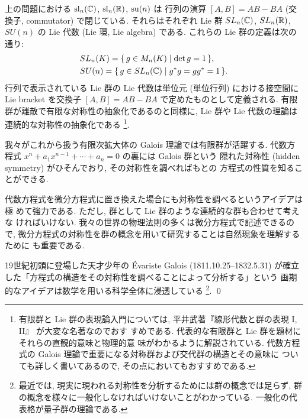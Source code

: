 \documentclass[12pt,twoside]{jarticle}
\begin{document}
\begin{guide}
  上の問題における $\mathrm{sl}_n({\mathbb C})$, $\mathrm{sl}_n({\mathbb R})$, $\mathrm{su}(n)$ は
  行列の演算 $[A,B]=AB-BA$ (交換子, commutator) で閉じている.
  それらはそれぞれ Lie 群 $SL_n({\mathbb C})$, $SL_n({\mathbb R})$, $SU(n)$ の Lie 代数 
  (Lie 環, Lie algebra) である.  これらの Lie 群の定義は次の通り:
  \begin{align*}
    &
    SL_n(K) = \{\, g\in M_n(K) \mid \det g = 1 \,\},
    \\ &
    SU(n) = \{\, g\in SL_n({\mathbb C}) \mid g^* g = g g^* = 1 \,\}.
  \end{align*}
  行列で表示されている Lie 群の Lie 代数は単位元 (単位行列) における接空間に 
  Lie bracket を交換子 $[A,B]=AB-BA$ で定めたものとして定義される. 
  有限群が離散で有限な対称性の抽象化であるのと同様に, 
  Lie 群や Lie 代数の理論は連続的な対称性の抽象化である%
  \footnote{有限群と Lie 群の表現論入門については, 
    平井武著『線形代数と群の表現 I, II』 \cite{hirai} が大変な名著なのでおす
    すめである.  代表的な有限群と Lie 群を題材にそれらの直観的意味と物理的意
    味がわかるように解説されている.
    代数方程式の Galois 理論で重要になる対称群および交代群の構造とその意味に
    ついても詳しく書いてあるので, その点においてもおすすめである.}. 

  我々がこれから扱う有限次拡大体の Galois 理論では有限群が活躍する.
  代数方程式 $x^n + a_1 x^{n-1} + \cdots + a_n = 0$ の裏には Galois 群という
  隠れた対称性 (hidden symmetry) がひそんでおり, その対称性を調べればもとの
  方程式の性質を知ることができる.

  代数方程式を微分方程式に置き換えた場合にも対称性を調べるというアイデアは極
  めて強力である.  ただし, 群として Lie 群のような連続的な群も合わせて考えな
  ければいけない.  我々の世界の物理法則の多くは微分方程式で記述できるので, 
  微分方程式の対称性を群の概念を用いて研究することは自然現象を理解するために
  も重要である. 

  19世紀初頭に登場した天才少年の \'Evariste Galois (1811.10.25--1832.5.31)
  が確立した「方程式の構造をその対称性を調べることによって分析する」という
  画期的なアイデアは数学を用いる科学全体に浸透している%
  \footnote{最近では, 
    現実に現われる対称性を分析するためには群の概念では足らず, 
    群の概念を様々に一般化しなければいけないことがわかっている. 
    一般化の代表格が量子群の理論である.}.  \qed
\end{guide}
\end{document}
